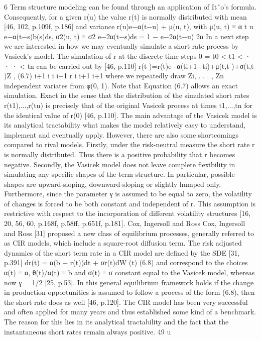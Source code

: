 6 Term structure modeling
can be found through an application of Itˆo’s formula. Consequently, for a given r(u) the value r(t) is normally distributed with mean [46, 102, p.109f, p.186]
and variance
r(u)e−α(t−u) + μ(u, t), with μ(u, t) ≡ α
t u
e−α(t−s)b(s)ds,
σ2(u, t) ≡ σ2
e−2α(t−s)ds =
1 − e−2α(t−u)
2α
In a next step we are interested in how we may eventually simulate a short rate process by
Vasicek’s model. The simulation of r at the discrete-time steps 0 = t0 < t1 < · · · < tn can be carried out by [46, p.110]
r(t )=r(t)e−α(ti+1−ti)+μ(t,t )+σ(t,t )Z , (6.7) i+1 i i i+1 r i i+1 i+1
where we repeatedly draw Zi, . . . , Zn independent variates from φ(0, 1). Note that Equation (6.7) allows an exact simulation. Exact in the sense that the distribution of the simulated short rates r(t1),...,r(tn) is precisely that of the original Vasicek process at times t1,...,tn for the identical value of r(0) [46, p.110].
The main advantage of the Vasicek model is its analytical tractability what makes the model relatively easy to understand, implement and eventually apply. However, there are also some shortcomings compared to rival models. Firstly, under the risk-neutral measure the short rate r is normally distributed. Thus there is a positive probability that r becomes negative. Secondly, the Vasicek model does not leave complete flexibility in simulating any specific shapes of the term structure. In particular, possible shapes are upward-sloping, downward-sloping or slightly humped only. Furthermore, since the parameter γ is assumed to be equal to zero, the volatility of changes is forced to be both constant and independent of r. This assumption is restrictive with respect to the incorporation of different volatility structures [16, 20, 56, 60, p.168f, p.58ff, p.651f, p.181].
Cox, Ingersoll and Ross
Cox, Ingersoll and Ross [31] proposed a new class of equilibrium processes, generally referred to as CIR models, which include a square-root diffusion term. The risk adjusted dynamics of the short term rate in a CIR model are defined by the SDE [31, p.391]
dr(t) = α(b − r(t))dt + σr(t)dW (t) (6.8)
and correspond to the choices α(t) ≡ α, θ(t)/α(t) ≡ b and σ(t) ≡ σ constant equal to the Vasicek model, whereas now γ = 1/2 [25, p.53]. In this general equilibrium framework holds if the change in production opportunities is assumed to follow a process of the form (6.8), then the short rate does as well [46, p.120]. The CIR model has been very successful and often applied for many years and thus established some kind of a benchmark. The reason for this lies in its analytical tractability and the fact that the instantaneous short rates remain always positive.
49
u

